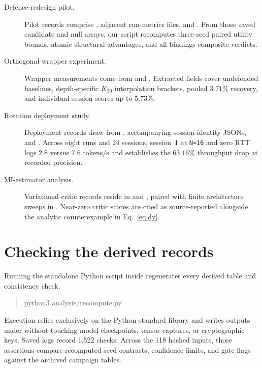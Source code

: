 \begin{description}
\item[\hypertarget{artifact-P4}{Defence-redesign pilot.}]
Pilot records comprise
,
adjacent run-metrics files, and
. From those saved
candidate and null arrays, our script recomputes three-seed paired utility
bounds, atomic structural advantages, and all-bindings composite verdicts.

\item[\hypertarget{artifact-E8}{Orthogonal-wrapper experiment.}]
Wrapper measurements come from
and . Extracted fields
cover undefended baselines, depth-specific $K_{50}$ interpolation brackets,
pooled $3.71\%$ recovery, and individual session scores up to $5.73\%$.

\item[\hypertarget{artifact-ER}{Rotation deployment study.}]
Deployment records draw from
,
accompanying session-identity JSONs, and
. Across eight runs and 24 sessions, session~1 at \texttt{N=16} and zero RTT
logs $2.8$ versus $7.6$ tokens/s and establishes the $63.16\%$ throughput
drop at recorded precision.

\item[\hypertarget{artifact-MI}{MI-estimator analysis.}]
Variational critic records reside in
 and
, paired with finite
architecture sweeps in
. Near-zero
critic scores are cited as source-reported alongside the analytic
counterexample in Eq.~\eqref{eq:dv}.
\end{description}

\section{Checking the derived records}
\label{app:checks}

Running the standalone Python script inside  regenerates
every derived table and consistency check.
\begin{quote}\small\ttfamily
python3 analysis/recompute.py
\end{quote}
Execution relies exclusively on the Python standard library and writes
outputs under  without touching model checkpoints,
tensor captures, or cryptographic keys. Saved logs record 1,522 checks.
Across the 118 hashed inputs, those assertions compare recomputed seed
contrasts, confidence limits, and gate flags against the archived campaign
tables.

